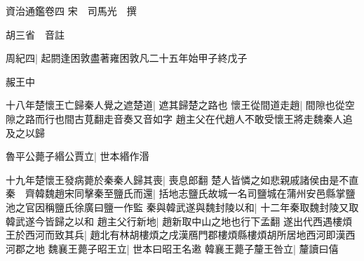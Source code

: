資治通鑑卷四
宋　司馬光　撰

胡三省　音註

周紀四|{
	起閼逢困敦盡著雍困敦凡二十五年始甲子終戊子}


赧王中

十八年楚懷王亡歸秦人覺之遮楚道|{
	遮其歸楚之路也}
懷王從間道走趙|{
	間隙也從空隙之路而行也間古莧翻走音奏又音如字}
趙主父在代趙人不敢受懷王將走魏秦人追及之以歸

魯平公薨子緡公賈立|{
	世本緡作湣}


十九年楚懷王發病薨於秦秦人歸其喪|{
	喪息郎翻}
楚人皆憐之如悲親戚諸侯由是不直秦　齊韓魏趙宋同擊秦至鹽氏而還|{
	括地志鹽氏故城一名司鹽城在蒲州安邑縣掌鹽池之官因稱鹽氏徐廣曰鹽一作監}
秦與韓武遂與魏封陵以和|{
	十二年秦取魏封陵又取韓武遂今皆歸之以和}
趙主父行新地|{
	趙新取中山之地也行下孟翻}
遂出代西遇樓煩王於西河而致其兵|{
	趙北有林胡樓煩之戌漢鴈門郡樓煩縣樓煩胡所居地西河即漢西河郡之地}
魏襄王薨子昭王立|{
	世本曰昭王名遫}
韓襄王薨子釐王咎立|{
	釐讀曰僖}


